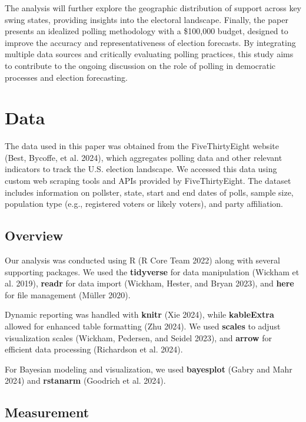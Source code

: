\documentclass[
  letterpaper,
  DIV=11,
  numbers=noendperiod]{scrartcl}
\begin{document}
The analysis will further explore the geographic distribution of support
across key swing states, providing insights into the electoral
landscape. Finally, the paper presents an idealized polling methodology
with a \$100,000 budget, designed to improve the accuracy and
representativeness of election forecasts. By integrating multiple data
sources and critically evaluating polling practices, this study aims to
contribute to the ongoing discussion on the role of polling in
democratic processes and election forecasting.

\hypertarget{sec-data}{%
\section{Data}\label{sec-data}}

The data used in this paper was obtained from the FiveThirtyEight
website (Best, Bycoffe, et al. 2024), which aggregates polling data and
other relevant indicators to track the U.S. election landscape. We
accessed this data using custom web scraping tools and APIs provided by
FiveThirtyEight. The dataset includes information on pollster, state,
start and end dates of polls, sample size, population type (e.g.,
registered voters or likely voters), and party affiliation.

\hypertarget{overview}{%
\subsection{Overview}\label{overview}}

Our analysis was conducted using R (R Core Team 2022) along with several
supporting packages. We used the \textbf{tidyverse} for data
manipulation (Wickham et al. 2019), \textbf{readr} for data import
(Wickham, Hester, and Bryan 2023), and \textbf{here} for file management
(Müller 2020).

Dynamic reporting was handled with \textbf{knitr} (Xie 2024), while
\textbf{kableExtra} allowed for enhanced table formatting (Zhu 2024). We
used \textbf{scales} to adjust visualization scales (Wickham, Pedersen,
and Seidel 2023), and \textbf{arrow} for efficient data processing
(Richardson et al. 2024).

For Bayesian modeling and visualization, we used \textbf{bayesplot}
(Gabry and Mahr 2024) and \textbf{rstanarm} (Goodrich et al. 2024).

\hypertarget{measurement}{%
\subsection{Measurement}\label{measurement}}
\end{document}
